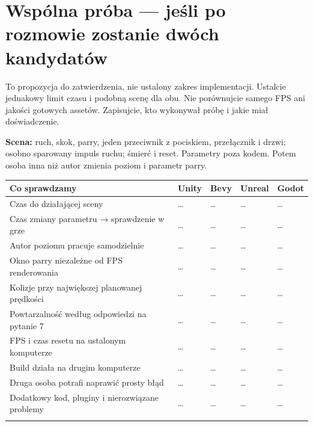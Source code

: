 \documentclass[10pt,a4paper]{article}
\begin{document}
\clearpage
\section*{Wspólna próba — jeśli po rozmowie zostanie dwóch kandydatów}


To propozycja do zatwierdzenia, nie ustalony zakres implementacji. Ustalcie jednakowy limit czasu i podobną scenę dla obu. Nie porównujcie samego FPS ani jakości gotowych assetów. Zapisujcie, kto wykonywał próbę i jakie miał doświadczenie.



\textbf{Scena:} ruch, skok, parry, jeden przeciwnik z pociskiem, przełącznik i drzwi; osobno sparowany impuls ruchu; śmierć i reset. Parametry poza kodem. Potem osoba inna niż autor zmienia poziom i parametr parry.



{\scriptsize\setlength{\tabcolsep}{2mm}\begin{longtable}{>{\raggedright\arraybackslash}p{61.60mm}>{\raggedright\arraybackslash}p{23.10mm}>{\raggedright\arraybackslash}p{23.10mm}>{\raggedright\arraybackslash}p{23.10mm}>{\raggedright\arraybackslash}p{23.10mm}}
\toprule \textbf{Co sprawdzamy} & \textbf{Unity} & \textbf{Bevy} & \textbf{Unreal} & \textbf{Godot} \\ \midrule\endhead
Czas do działającej sceny & … & … & … & … \\ \addlinespace[2pt]
Czas zmiany parametru → sprawdzenie w grze & … & … & … & … \\ \addlinespace[2pt]
Autor poziomu pracuje samodzielnie & … & … & … & … \\ \addlinespace[2pt]
Okno parry niezależne od FPS renderowania & … & … & … & … \\ \addlinespace[2pt]
Kolizje przy największej planowanej prędkości & … & … & … & … \\ \addlinespace[2pt]
Powtarzalność według odpowiedzi na pytanie 7 & … & … & … & … \\ \addlinespace[2pt]
FPS i czas resetu na ustalonym komputerze & … & … & … & … \\ \addlinespace[2pt]
Build działa na drugim komputerze & … & … & … & … \\ \addlinespace[2pt]
Druga osoba potrafi naprawić prosty błąd & … & … & … & … \\ \addlinespace[2pt]
Dodatkowy kod, pluginy i nierozwiązane problemy & … & … & … & … \\ \addlinespace[2pt]
\bottomrule\end{longtable}}
\end{document}
